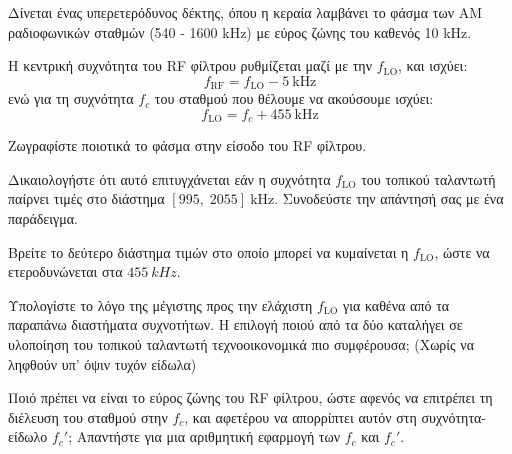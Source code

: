\documentclass[11pt,a4paper,notitlepage,fleqn,final]{article}
\begin{document}

Δίνεται ένας υπερετερόδυνος δέκτης, όπου η κεραία λαμβάνει το φάσμα των AM ραδιοφωνικών σταθμών
(540 - 1600 kHz) με εύρος ζώνης του καθενός 10 kHz.

Η κεντρική συχνότητα του RF φίλτρου ρυθμίζεται
μαζί με την \( f_{\mathrm{LO}} \), και ισχύει:
\[
f_{\mathrm{RF}} = f_{\mathrm{LO}} - \SI{5}{\kilo\hertz}
\]
ενώ για τη συχνότητα \( f_c \) του σταθμού που θέλουμε
να ακούσουμε ισχύει:
\[
f_{\mathrm{LO}} = f_c + \SI{455}{\kilo\hertz}
\]
\begin{enumgreekparen}
	\item Ζωγραφίστε ποιοτικά το φάσμα στην είσοδο
	του RF φίλτρου.
	\item Δικαιολογήστε ότι αυτό επιτυγχάνεται εάν η συχνότητα
	\( f_{\mathrm{LO}} \) του τοπικού ταλαντωτή παίρνει τιμές στο διάστημα \( [995,\;2055]\ \si{\kilo\hertz} \). Συνοδεύστε την απάντησή σας με ένα παράδειγμα.
	\item Βρείτε το δεύτερο διάστημα τιμών στο οποίο
	μπορεί να κυμαίνεται η \( f_{\mathrm{LO}} \), ώστε
	να ετεροδυνώνεται στα \( \SI{455}{kHz} \).
	\item Υπολογίστε το λόγο της μέγιστης προς την ελάχιστη \( f_{\mathrm{LO}} \)
	για καθένα από τα παραπάνω διαστήματα συχνοτήτων.
	Η επιλογή ποιού από τα δύο καταλήγει σε υλοποίηση του τοπικού ταλαντωτή
	τεχνοοικονομικά πιο συμφέρουσα; (Χωρίς να ληφθούν υπ' όψιν τυχόν είδωλα)
	\item Ποιό πρέπει να είναι το εύρος ζώνης του RF φίλτρου, ώστε αφενός να επιτρέπει τη
	διέλευση του σταθμού στην \( f_c \), και αφετέρου να απορρίπτει αυτόν στη συχνότητα-είδωλο
	\(f_c'\); Απαντήστε για μια αριθμητική εφαρμογή των \( f_c \) και \( f_c' \).
\end{enumgreekparen}
\end{document}
